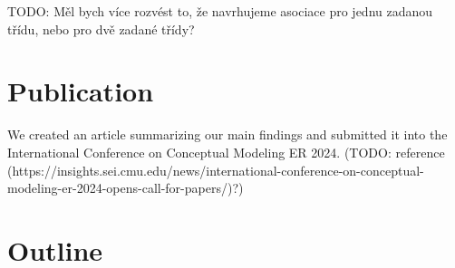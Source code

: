 TODO: Měl bych více rozvést to, že navrhujeme asociace pro jednu zadanou třídu, nebo pro dvě zadané třídy? \\


\section*{Publication}
We created an article summarizing our main findings and submitted it into the International Conference on Conceptual Modeling ER 2024. (TODO: reference (https://insights.sei.cmu.edu/news/international-conference-on-conceptual-modeling-er-2024-opens-call-for-papers/)?)

\section*{Outline}
